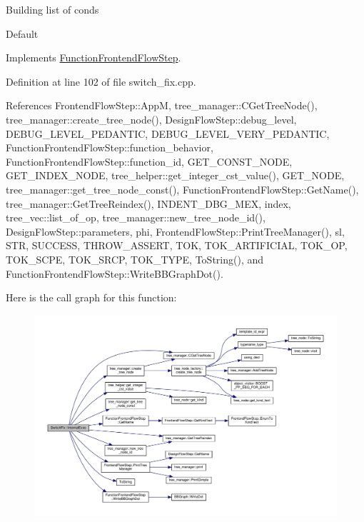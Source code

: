 Building list of conds

Default 

Implements \hyperlink{classFunctionFrontendFlowStep_a00612f7fb9eabbbc8ee7e39d34e5ac68}{Function\+Frontend\+Flow\+Step}.



Definition at line 102 of file switch\+\_\+fix.\+cpp.



References Frontend\+Flow\+Step\+::\+AppM, tree\+\_\+manager\+::\+C\+Get\+Tree\+Node(), tree\+\_\+manager\+::create\+\_\+tree\+\_\+node(), Design\+Flow\+Step\+::debug\+\_\+level, D\+E\+B\+U\+G\+\_\+\+L\+E\+V\+E\+L\+\_\+\+P\+E\+D\+A\+N\+T\+IC, D\+E\+B\+U\+G\+\_\+\+L\+E\+V\+E\+L\+\_\+\+V\+E\+R\+Y\+\_\+\+P\+E\+D\+A\+N\+T\+IC, Function\+Frontend\+Flow\+Step\+::function\+\_\+behavior, Function\+Frontend\+Flow\+Step\+::function\+\_\+id, G\+E\+T\+\_\+\+C\+O\+N\+S\+T\+\_\+\+N\+O\+DE, G\+E\+T\+\_\+\+I\+N\+D\+E\+X\+\_\+\+N\+O\+DE, tree\+\_\+helper\+::get\+\_\+integer\+\_\+cst\+\_\+value(), G\+E\+T\+\_\+\+N\+O\+DE, tree\+\_\+manager\+::get\+\_\+tree\+\_\+node\+\_\+const(), Function\+Frontend\+Flow\+Step\+::\+Get\+Name(), tree\+\_\+manager\+::\+Get\+Tree\+Reindex(), I\+N\+D\+E\+N\+T\+\_\+\+D\+B\+G\+\_\+\+M\+EX, index, tree\+\_\+vec\+::list\+\_\+of\+\_\+op, tree\+\_\+manager\+::new\+\_\+tree\+\_\+node\+\_\+id(), Design\+Flow\+Step\+::parameters, phi, Frontend\+Flow\+Step\+::\+Print\+Tree\+Manager(), sl, S\+TR, S\+U\+C\+C\+E\+SS, T\+H\+R\+O\+W\+\_\+\+A\+S\+S\+E\+RT, T\+OK, T\+O\+K\+\_\+\+A\+R\+T\+I\+F\+I\+C\+I\+AL, T\+O\+K\+\_\+\+OP, T\+O\+K\+\_\+\+S\+C\+PE, T\+O\+K\+\_\+\+S\+R\+CP, T\+O\+K\+\_\+\+T\+Y\+PE, To\+String(), and Function\+Frontend\+Flow\+Step\+::\+Write\+B\+B\+Graph\+Dot().

Here is the call graph for this function\+:
\nopagebreak
\begin{figure}[H]
\begin{center}
\leavevmode
\includegraphics[width=350pt]{de/def/classSwitchFix_ab796548c62324fd3b26815dbf021cdfd_cgraph}
\end{center}
\end{figure}


